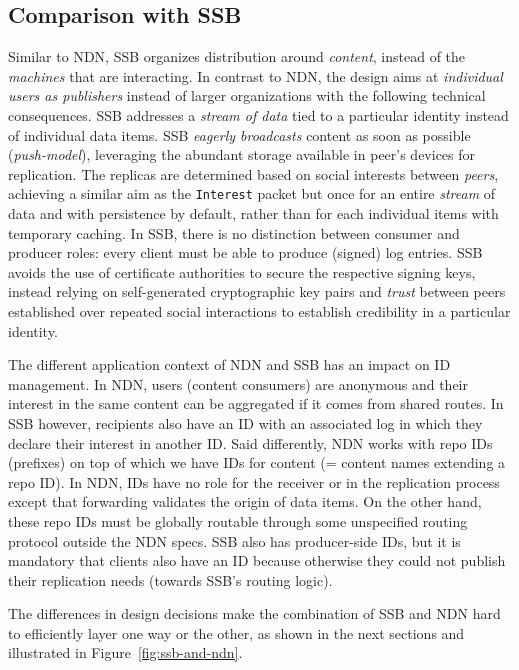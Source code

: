 \documentclass[9pt,sigconf]{acmart}
\begin{document}
\subsection{Comparison with SSB}

Similar to NDN, SSB organizes distribution around {\em content},
instead of the {\em machines} that are interacting. In contrast to
NDN, the design aims at \textit{individual users as publishers}
instead of larger organizations with the following technical
consequences. SSB addresses a \textit{stream of data} tied to a
particular identity instead of individual data items. SSB
\textit{eagerly broadcasts} content as soon as possible
(\textit{push-model}), leveraging the abundant storage available in
peer's devices for replication. The replicas are determined based on
social interests between \textit{peers}, achieving a similar aim as
the \texttt{Interest} packet but once for an entire \textit{stream} of
data and with persistence by default, rather than for each individual
items with temporary caching. In SSB, there is no distinction between
consumer and producer roles: every client must be able to produce
(signed) log entries. SSB avoids the use of certificate authorities to
secure the respective signing keys, instead relying on self-generated
cryptographic key pairs and \textit{trust} between peers established
over repeated social interactions to establish credibility in a
particular identity.

The different application context of NDN and SSB has an impact on ID
management. In NDN, users (content consumers) are anonymous and their
interest in the same content can be aggregated if it comes from shared
routes. In SSB however, recipients also have an ID with an associated
log in which they declare their interest in another ID. Said
differently, NDN works with repo IDs (prefixes) on top of which we
have IDs for content (= content names extending a repo ID). In NDN,
IDs have no role for the receiver or in the replication process except
that forwarding validates the origin of data items. On the other hand,
these repo IDs must be globally routable through some unspecified
routing protocol outside the NDN specs. SSB also has producer-side
IDs, but it is mandatory that clients also have an ID because
otherwise they could not publish their replication needs (towards
SSB's routing logic).

The differences in design decisions make the combination of SSB and
NDN hard to efficiently layer one way or the other, as shown in the
next sections and illustrated in Figure~\ref{fig:ssb-and-ndn}.
\end{document}
